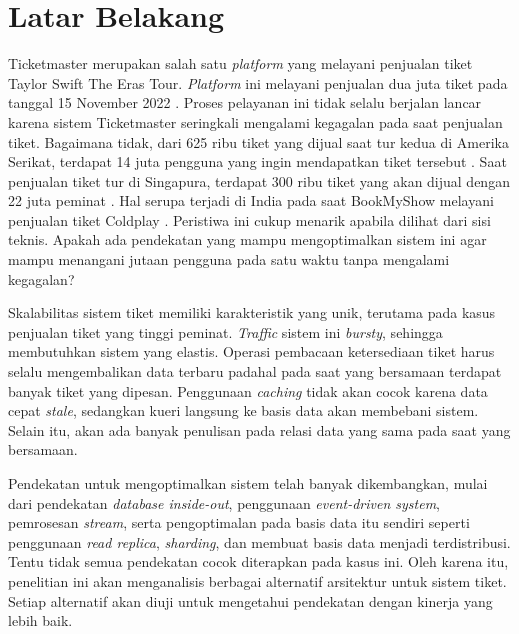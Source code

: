 \section{Latar Belakang}
\label{sec:latar-belakang}

Ticketmaster merupakan salah satu \textit{platform} yang melayani penjualan tiket Taylor Swift The Eras Tour. \textit{Platform} ini melayani penjualan dua juta tiket pada tanggal 15 November 2022 \parencite{swiftTicketmaster}. Proses pelayanan ini tidak selalu berjalan lancar karena sistem Ticketmaster seringkali mengalami kegagalan pada saat penjualan tiket. Bagaimana tidak, dari 625 ribu tiket yang dijual saat tur kedua di Amerika Serikat, terdapat 14 juta pengguna yang ingin mendapatkan tiket tersebut \parencite{USTaylorSwift}. Saat penjualan tiket tur di Singapura, terdapat 300 ribu tiket yang akan dijual dengan 22 juta peminat \parencite{asiaTaylorSwift}. Hal serupa terjadi di India pada saat BookMyShow melayani penjualan tiket Coldplay \parencite{coldplayBookMyShow}. Peristiwa ini cukup menarik apabila dilihat dari sisi teknis. Apakah ada pendekatan yang mampu mengoptimalkan sistem ini agar mampu menangani jutaan pengguna pada satu waktu tanpa mengalami kegagalan?

Skalabilitas sistem tiket memiliki karakteristik yang unik, terutama pada kasus penjualan tiket yang tinggi peminat. \textit{Traffic} sistem ini \textit{bursty}, sehingga membutuhkan sistem yang elastis. Operasi pembacaan ketersediaan tiket harus selalu mengembalikan data terbaru padahal pada saat yang bersamaan terdapat banyak tiket yang dipesan. Penggunaan \textit{caching} tidak akan cocok karena data cepat \textit{stale}, sedangkan kueri langsung ke basis data akan membebani sistem. Selain itu, akan ada banyak penulisan pada relasi data yang sama pada saat yang bersamaan.

Pendekatan untuk mengoptimalkan sistem telah banyak dikembangkan, mulai dari pendekatan \textit{database inside-out}, penggunaan \textit{event-driven system}, pemrosesan \textit{stream}, serta pengoptimalan pada basis data itu sendiri seperti penggunaan \textit{read replica}, \textit{sharding}, dan membuat basis data menjadi terdistribusi. Tentu tidak semua pendekatan cocok diterapkan pada kasus ini. Oleh karena itu, penelitian ini akan menganalisis berbagai alternatif arsitektur untuk sistem tiket. Setiap alternatif akan diuji untuk mengetahui pendekatan dengan kinerja yang lebih baik.